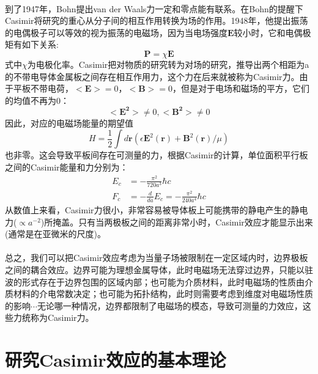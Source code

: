 \paragraph*{}
到了1947年，Bohn提出van der Waals力一定和零点能有联系。在Bohn的提醒下Casimir将研究的重心从分子间的相互作用转换为场的作用。1948年，他提出振荡的电偶极子可以等效的视为振荡的电磁场，因为当电场强度$\boldsymbol{E}$较小时，它和电偶极矩有如下关系:
$$
\boldsymbol{P}=\chi\boldsymbol{E}
$$
式中$\chi$为电极化率。Casimir把对物质的研究转为对场的研究，推导出两个相距为a的不带电导体金属板之间存在相互作用力\cite{Casimir_1948}，这个力在后来就被称为Casimir力。由于平板不带电荷，$<\boldsymbol{E}>=0$，$<\boldsymbol{B}>=0$，但是对于电场和磁场的平方，它们的均值不再为0：
$$
<\boldsymbol{E^2}> \ne 0, <\boldsymbol{B^2}> \ne 0
$$
因此，对应的电磁场能量的期望值
$$
H=\frac{1}{2}\int{d\boldsymbol{r}\left( \epsilon \boldsymbol{E}^2\left( \boldsymbol{r} \right) +\boldsymbol{B}^2\left( \boldsymbol{r} \right) /\mu \right)}
$$
也非零。这会导致平板间存在可测量的力，根据Casimir的计算，单位面积平行板之间的Casimir能量和力分别为：
\begin{equation*}
    \begin{split}
    E_{c}&=-\frac{\pi ^2}{720a^3}\hbar c\\
    F_{c}&=-\frac{d}{da}E_{c}=-\frac{\pi ^2}{240a^4}\hbar c
    \end{split}
\end{equation*}
从数值上来看，Casimir力很小，非常容易被导体板上可能携带的静电产生的静电力($\propto a^{-2}$)所掩盖。只有当两极板之间的距离非常小时，Casimir效应才能显示出来(通常是在亚微米的尺度)。
\paragraph*{}
总之，我们可以把Casimir效应考虑为当量子场被限制在一定区域内时，边界极板之间的耦合效应。边界可能为理想金属导体，此时电磁场无法穿过边界，只能以驻波的形式存在于边界包围的区域内部；也可能为介质材料，此时电磁场的性质由介质材料的介电常数决定；也可能为拓扑结构，此时则需要考虑到维度对电磁场性质的影响$\cdots$无论哪一种情况，边界都限制了电磁场的模态，导致可测量的力效应，这些力统称为Casimir力。



\section{研究Casimir效应的基本理论}
